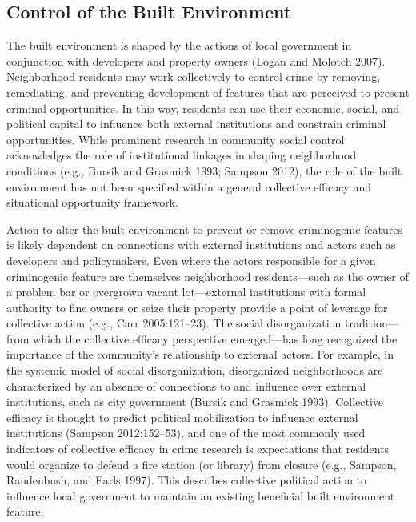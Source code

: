 \documentclass [11pt, proquest] {uwthesis}[2015/03/03]
\begin{document}
\hypertarget{control-of-the-built-environment}{%
\subsection{Control of the Built Environment}\label{control-of-the-built-environment}}

The built environment is shaped by the actions of local government in conjunction with developers and property owners (Logan and Molotch 2007). Neighborhood residents may work collectively to control crime by removing, remediating, and preventing development of features that are perceived to present criminal opportunities. In this way, residents can use their economic, social, and political capital to influence both external institutions and constrain criminal opportunities. While prominent research in community social control acknowledges the role of institutional linkages in shaping neighborhood conditions (e.g., Bursik and Grasmick 1993; Sampson 2012), the role of the built environment has not been specified within a general collective efficacy and situational opportunity framework.

Action to alter the built environment to prevent or remove criminogenic features is likely dependent on connections with external institutions and actors such as developers and policymakers. Even where the actors responsible for a given criminogenic feature are themselves neighborhood residents---such as the owner of a problem bar or overgrown vacant lot---external institutions with formal authority to fine owners or seize their property provide a point of leverage for collective action (e.g., Carr 2005:121--23). The social disorganization tradition---from which the collective efficacy perspective emerged---has long recognized the importance of the community's relationship to external actors. For example, in the systemic model of social disorganization, disorganized neighborhoods are characterized by an absence of connections to and influence over external institutions, such as city government (Bursik and Grasmick 1993). Collective efficacy is thought to predict political mobilization to influence external institutions (Sampson 2012:152--53), and one of the most commonly used indicators of collective efficacy in crime research is expectations that residents would organize to defend a fire station (or library) from closure (e.g., Sampson, Raudenbush, and Earls 1997). This describes collective political action to influence local government to maintain an existing beneficial built environment feature.
\end{document}
